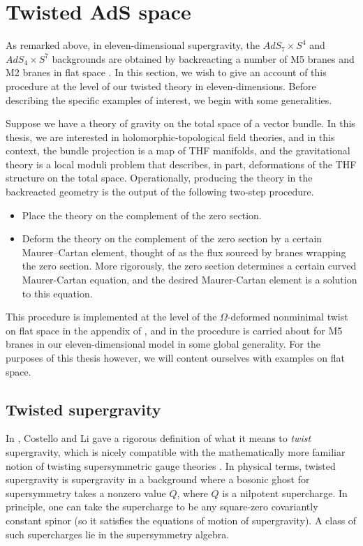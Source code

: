 \documentclass[../main.tex]{subfiles}
\begin{document}
 
\section{Twisted AdS space}
\label{sec:ads}

As remarked above, in eleven-dimensional supergravity, the $AdS_7 \times S^4$ and $AdS_4\times S^7$ backgrounds are obtained by backreacting a number of M5 branes and M2 branes in flat space \cite{Maldacena:1997re,WittenAdS}. In this section, we wish to give an account of this procedure at the level of our twisted theory in eleven-dimensions. Before describing the specific examples of interest, we begin with some generalities.

Suppose we have a theory of gravity on the total space of a vector bundle. In this thesis, we are interested in holomorphic-topological field theories, and in this context, the bundle projection is a map of THF manifolds, and the gravitational theory is a local moduli problem that describes, in part, deformations of the THF structure on the total space. Operationally, producing the theory in the backreacted geometry is the output of the following two-step procedure. 

\begin{itemize}
  \item Place the theory on the complement of the zero section. 
  \item Deform the theory on the complement of the zero section by a certain Maurer--Cartan element, thought of as the flux sourced by branes wrapping the zero section. More rigorously, the zero section determines a certain curved Maurer-Cartan equation, and the desired Maurer-Cartan element is a solution to this equation. 
\end{itemize}

This procedure is implemented at the level of the $\Omega$-deformed nonminimal twist on flat space in the appendix of \cite{CostelloM5}, and in \cite{raghavendran2022holographic} the procedure is carried about for M5 branes in our eleven-dimensional model in some global generality. For the purposes of this thesis however, we will content ourselves with examples on flat space. 

\subsection{Twisted supergravity}

In \cite{CLsugra}, Costello and Li gave a rigorous definition of what it means to {\em twist} supergravity, which is nicely compatible with the mathematically more familiar notion of twisting supersymmetric gauge theories \cite{WittenTwist}.
In physical terms, twisted supergravity is supergravity in a background where a bosonic ghost for supersymmetry takes a nonzero value $Q$, where $Q$ is a nilpotent supercharge.
In principle, one can take the supercharge to be any square-zero covariantly constant spinor (so it satisfies the equations of motion of supergravity).
A class of such supercharges lie in the supersymmetry algebra.
\end{document}
